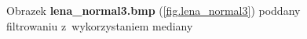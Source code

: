 \documentclass{classrep}
\begin{document}
\begin{figure}
{{  \label{fig.lena_normal3_median_5x5}
 }
}
\caption{Obrazek \textbf{lena\_normal3.bmp} (\ref{fig.lena_normal3}) poddany filtrowaniu z~wykorzystaniem mediany}
\label{fig.lena_normal3_median}
\end{figure}
\end{document}
